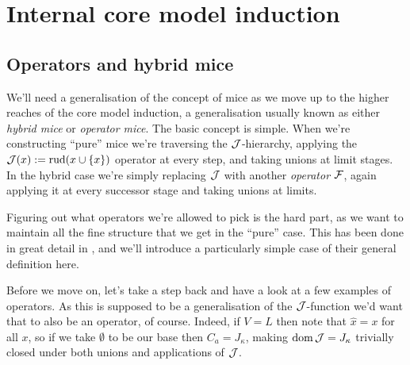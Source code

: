 \documentclass[../../main]{subfiles}
\begin{document}
\chapter{Internal core model induction}
\thispagestyle{fancy}


\section{Operators and hybrid mice}

We'll need a generalisation of the concept of mice as we move up to the higher reaches of the core model induction, a generalisation usually known as either \textit{hybrid mice} or \textit{operator mice}. The basic concept is simple. When we're constructing ``pure'' mice we're traversing the $\operatorname{\mathcal J}$-hierarchy, applying the $\operatorname{\mathcal J}(x):=\operatorname{rud}(x\cup\{x\})$ operator at every step, and taking unions at limit stages. In the hybrid case we're simply replacing $\operatorname{\mathcal J}$ with another \textit{operator} $\operatorname{\mathcal F}$, again applying it at every successor stage and taking unions at limits.

\qquad Figuring out what operators we're allowed to pick is the hard part, as we want to maintain all the fine structure that we get in the ``pure'' case. This has been done in great detail in \cite{SchlutzenbergTrang}, and we'll introduce a particularly simple case of their general definition here.



Before we move on, let's take a step back and have a look at a few examples of operators. As this is supposed to be a generalisation of the $\operatorname{\mathcal J}$-function we'd want that to also be an operator, of course. Indeed, if $V=L$ then note that $\hat x=x$ for all $x$, so if we take $\emptyset$ to be our base then $C_a=J_\kappa$, making $\operatorname{dom}\operatorname{\mathcal J}=J_\kappa$ trivially closed under both unions and applications of $\operatorname{\mathcal J}$.
\end{document}
